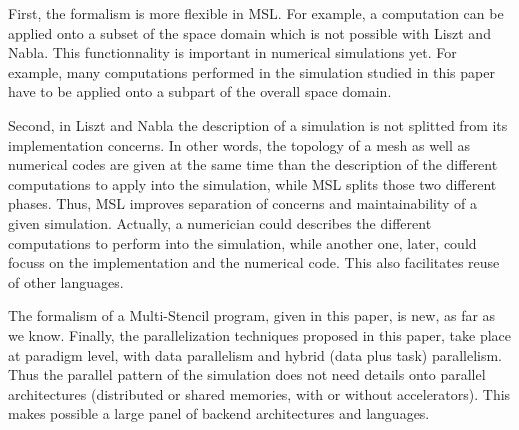 First, the formalism is more flexible in MSL. For example, a computation can be applied onto a subset of the space domain which is not possible with Liszt and Nabla. This functionnality is important in numerical simulations yet. For example, many computations performed in the simulation studied in this paper have to be applied onto a subpart of the overall space domain.

Second, in Liszt and Nabla the description of a simulation is not splitted from its implementation concerns. In other words, the topology of a mesh as well as numerical codes are given at the same time than the description of the different computations to apply into the simulation, while MSL splits those two different phases. Thus, MSL improves separation of concerns and maintainability of a given simulation. Actually, a numerician could describes the different computations to perform into the simulation, while another one, later, could focuss on the implementation and the numerical code. This also facilitates reuse of other languages. 

The formalism of a Multi-Stencil program, given in this paper, is new, as far as we know. Finally, the parallelization techniques proposed in this paper, take place at paradigm level, with data parallelism and hybrid (data plus task) parallelism. Thus the parallel pattern of the simulation does not need details onto parallel architectures (distributed or shared memories, with or without accelerators). This makes possible a large panel of backend architectures and languages.